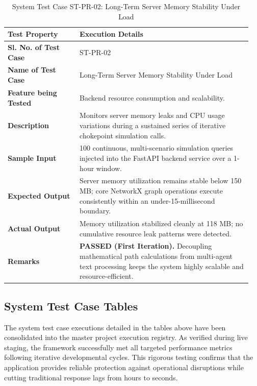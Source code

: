 \begin{table}[H]
    \centering
    \caption{System Test Case ST-PR-02: Long-Term Server Memory Stability Under Load}
    \label{tab:stpr02}
    \begin{tabular}{|p{0.28\linewidth}|p{0.67\linewidth}|}
        \hline
        \textbf{Test Property} & \textbf{Execution Details} \\ \hline
        \textbf{Sl. No. of Test Case} & ST-PR-02 \\ \hline
        \textbf{Name of Test Case} & Long-Term Server Memory Stability Under Load \\ \hline
        \textbf{Feature being Tested} & Backend resource consumption and scalability. \\ \hline
        \textbf{Description} & Monitors server memory leaks and CPU usage variations during a sustained series of iterative chokepoint simulation calls. \\ \hline
        \textbf{Sample Input} & 100 continuous, multi-scenario simulation queries injected into the FastAPI backend service over a 1-hour window. \\ \hline
        \textbf{Expected Output} & Server memory utilization remains stable below 150 MB; core NetworkX graph operations execute consistently within an under-15-millisecond boundary. \\ \hline
        \textbf{Actual Output} & Memory utilization stabilized cleanly at 118 MB; no cumulative resource leak patterns were detected. \\ \hline
        \textbf{Remarks} & \textbf{PASSED (First Iteration).} Decoupling mathematical path calculations from multi-agent text processing keeps the system highly scalable and resource-efficient. \\ \hline
    \end{tabular}
\end{table}

\subsection{System Test Case Tables}
The system test case executions detailed in the tables above have been consolidated into the master project execution registry. As verified during live staging, the framework successfully met all targeted performance metrics following iterative developmental cycles. This rigorous testing confirms that the application provides reliable protection against operational disruptions while cutting traditional response lags from hours to seconds.


